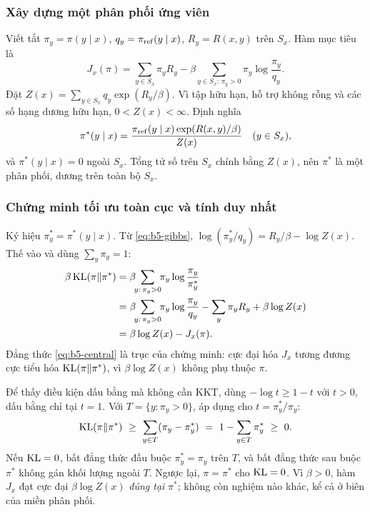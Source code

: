 \subsubsection{Xây dựng một phân phối ứng viên}

Viết tắt $\pi_y=\pi(y\mid x)$, $q_y=\pi_{\mathrm{ref}}(y\mid x)$, $R_y=R(x,y)$ trên $S_x$. Hàm
mục tiêu là
\begin{equation}
  J_x(\pi)=\sum_{y\in S_x}\pi_y R_y
    -\beta\!\!\sum_{y\in S_x:\,\pi_y>0}\!\!\pi_y\log\frac{\pi_y}{q_y}.
  \label{eq:b5-obj}
\end{equation}
Đặt $Z(x)=\sum_{y\in S_x}q_y\exp(R_y/\beta)$. Vì tập hữu hạn, hỗ trợ không rỗng và
các số hạng dương hữu hạn, $0<Z(x)<\infty$. Định nghĩa
\begin{equation}
  \pi^*(y\mid x)=\frac{\pi_{\mathrm{ref}}(y\mid x)\exp(R(x,y)/\beta)}{Z(x)}
  \quad(y\in S_x),
  \label{eq:b5-gibbs}
\end{equation}
và $\pi^*(y\mid x)=0$ ngoài $S_x$. Tổng tử số trên $S_x$ chính bằng $Z(x)$, nên
$\pi^*$ là một phân phối, dương trên toàn bộ $S_x$.

\subsubsection{Chứng minh tối ưu toàn cục và tính duy nhất}

Ký hiệu $\pi_y^*=\pi^*(y\mid x)$. Từ \eqref{eq:b5-gibbs},
$\log(\pi_y^*/q_y)=R_y/\beta-\log Z(x)$. Thế vào và dùng $\sum_y\pi_y=1$:
\begin{align}
  \beta\KL(\pi\|\pi^*)
     &=\beta\!\!\sum_{y:\,\pi_y>0}\!\!\pi_y\log\frac{\pi_y}{\pi_y^*}\notag\\
     &=\beta\!\!\sum_{y:\,\pi_y>0}\!\!\pi_y\log\frac{\pi_y}{q_y}
       -\sum_y\pi_y R_y+\beta\log Z(x)\notag\\
     &=\beta\log Z(x)-J_x(\pi).
  \label{eq:b5-central}
\end{align}
Đẳng thức \eqref{eq:b5-central} là trục của chứng minh: cực đại hóa $J_x$ tương
đương cực tiểu hóa $\operatorname{KL}(\pi\|\pi^*)$, vì $\beta\log Z(x)$ không phụ thuộc $\pi$.

Để thấy điều kiện dấu bằng mà không cần KKT, dùng $-\log t\ge 1-t$ với $t>0$, dấu
bằng chỉ tại $t=1$. Với $T=\{y:\pi_y>0\}$, áp dụng cho $t=\pi_y^*/\pi_y$:
\begin{equation}
  \operatorname{KL}(\pi\|\pi^*)\ \ge\ \sum_{y\in T}(\pi_y-\pi_y^*)
       \ =\ 1-\sum_{y\in T}\pi_y^*\ \ge\ 0.
  \label{eq:b5-unique}
\end{equation}
Nếu $\operatorname{KL}=0$, bất đẳng thức đầu buộc $\pi_y^*=\pi_y$ trên $T$, và bất đẳng thức sau
buộc $\pi^*$ không gán khối lượng ngoài $T$. Ngược lại, $\pi=\pi^*$ cho $\operatorname{KL}=0$.
Vì $\beta>0$, hàm $J_x$ đạt cực đại $\beta\log Z(x)$ \emph{đúng tại} $\pi^*$; không
còn nghiệm nào khác, kể cả ở biên của miền phân phối.

